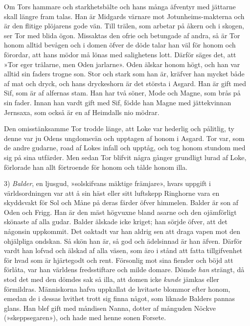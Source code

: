 Om Tors hammare och starkhetsbälte och hans många äfventyr med jättarne
skall längre fram talas. Han är Midgards värnare mot Jotunheims-makterna
och är den flitige plöjarens gode vän. Till trälen, som arbetar på åkern
och i skogen, ser Tor med blida ögon. Missaktas den ofrie och betungade
af andra, så är Tor honom alltid bevågen och i domen öfver de döde talar
han väl för honom och förordar, att hans mödor må lönas med salighetens
lott. Därför säges det, att »Tor eger trälarne, men Oden jarlarne». Oden
älskar honom högt, och han var alltid sin faders trogne son. Stor och
stark som han är, kräfver han mycket både af mat och dryck, och hans
dryckeshorn är det största i Asgard. Han är gift med Sif, som är af
alfernas stam. Han har två söner, Mode och Magne, som brås på sin fader.
Innan han vardt gift med Sif, födde han Magne med jättekvinnan Jernsaxa,
som också är en af Heimdalls nio mödrar.

Den omisstänksamme Tor trodde länge, att Loke var hederlig och pålitlig,
ty denne var ju Odens ungdomsvän och upptagen af honom i Asgard. Tor
var, som de andre gudarne, road af Lokes infall och upptåg, och tog
honom stundom med sig på sina utfärder. Men sedan Tor blifvit några
gånger
\protect\hypertarget{lb1625905.xhtmlux5cux23start29}{}{}\protect\hypertarget{lb1625905.xhtmlux5cux23start29-a}{}{}\protect\hypertarget{lb1625905.xhtmlux5cux23start29-b}{}{}\protect\hypertarget{lb1625905.xhtmlux5cux23start29-c}{}{}\protect\hypertarget{lb1625905.xhtmlux5cux23start29-d}{}{}
grundligt lurad af Loke, förlorade han allt förtroende för honom och
tålde honom illa.

3) \emph{Balder}, en ljusgud, »solskifvans mäktige främjare», hvars
uppgift i världsordningen var att å sin häst eller sitt luftskepp
Ringhorne vara en skyddsvakt för Sol och Måne på deras färder öfver
himmelen. Balder är son af Oden och Frigg. Han är den mäst högvuxne
bland asarne och den ojämförligt skönaste af alla gudar. Balder älskade
icke kriget; han sörjde öfver, att det någonsin uppkommit. Det oaktadt
var han aldrig sen att draga vapen mot den ohjälpliga ondskan. Så skön
han är, så god och ädelsinnad är han äfven. Därför vardt han lofvad och
älskad af alla väsen, som äro i stånd att fatta tillgifvenhet för hvad
som är hjärtegodt och rent. Försonlig mot sina fiender och böjd att
förlåta, var han världens fredsstiftare och milde domare. Dömde
\emph{han} strängt, då stod det med den dömdes sak så illa, att domen
icke \emph{kunde} jämkas eller förmildras. Människorna hafva uppkallat
de hvitaste blommor efter honom, emedan de i dessas hvithet trott sig
finna något, som liknade Balders pannas glans. Han blef gift med
måndisen Nanna, dotter af månguden Nöckve (»skeppsegaren»), och hade med
henne sonen Forsete.

